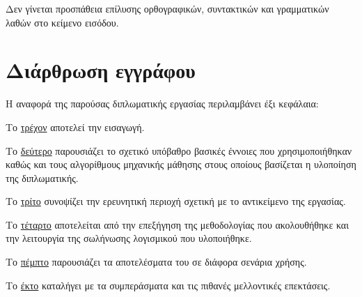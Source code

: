 Δεν γίνεται προσπάθεια επίλυσης ορθογραφικών, συντακτικών και γραμματικών λαθών στο κείμενο εισόδου.

\section{Διάρθρωση εγγράφου}\label{sec:structure}
Η αναφορά της παρούσας διπλωματικής εργασίας περιλαμβάνει έξι κεφάλαια:
\begin{compactenum}
    \item Το \hyperref[chap:intro]{τρέχον} αποτελεί την εισαγωγή.
    \item Το \hyperref[chap:background]{δεύτερο} παρουσιάζει το σχετικό υπόβαθρο\anoteleia{}
          βασικές έννοιες που χρησιμοποιήθηκαν καθώς και τους αλγορίθμους μηχανικής μάθησης στους οποίους βασίζεται η υλοποίηση της διπλωματικής.
    \item Το \hyperref[chap:state-of-the-art]{τρίτο} συνοψίζει την ερευνητική περιοχή σχετική με το αντικείμενο της εργασίας.
    \item Το \hyperref[chap:methodology]{τέταρτο} αποτελείται από την επεξήγηση της μεθοδολογίας που ακολουθήθηκε και την λειτουργία της σωλήνωσης λογισμικού που υλοποιήθηκε.
    \item Το \hyperref[chap:results]{πέμπτο} παρουσιάζει τα αποτελέσματα του \projectname{} σε διάφορα σενάρια χρήσης.
    \item Το \hyperref[chap:conclusions_future]{έκτο} καταλήγει με τα συμπεράσματα και τις πιθανές μελλοντικές επεκτάσεις.
\end{compactenum}


